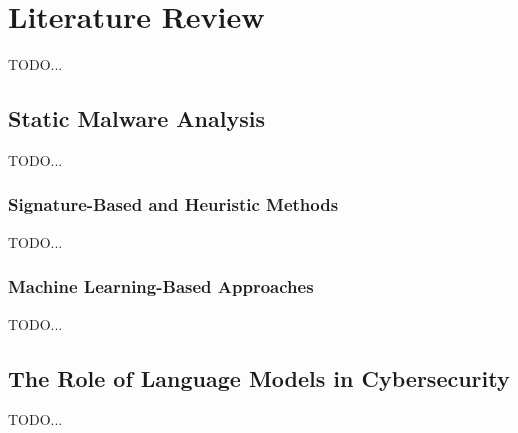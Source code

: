 \chapter{Literature Review}
\label{sec:LiteratureReview}
\label{Chapter2} %

TODO...

\section{Static Malware Analysis}
TODO...

\subsection{Signature-Based and Heuristic Methods}
TODO...

\subsection{Machine Learning-Based Approaches}
TODO...

\section{The Role of Language Models in Cybersecurity}
TODO...

